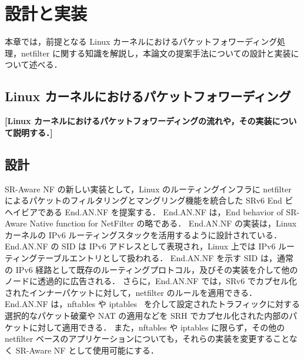 \chapter{設計と実装}
\label{chap:design_and_impl}
本章では，前提となる Linux カーネルにおけるパケットフォワーディング処理，netfilter に関する知識を解説し，本論文の提案手法についての設計と実装について述べる．
\section{Linux カーネルにおけるパケットフォワーディング}
\textbf{[Linux カーネルにおけるパケットフォワーディングの流れや，その実装について説明する．]}

\section{設計}
SR-Aware NF の新しい実装として，Linux のルーティングインフラに netfilter によるパケットのフィルタリングとマングリング機能を統合した SRv6 End ビヘイビアである End.AN.NF を提案する．
End.AN.NF は，End behavior of SR-Aware Native function for NetFilter の略である．
End.AN.NF の実装は，Linux カーネルの IPv6 ルーティングスタックを活用するように設計されている．
End.AN.NF の SID は IPv6 アドレスとして表現され，Linux 上では IPv6 ルーティングテーブルエントリとして扱われる．
End.AN.NF を示す SID は，通常の IPv6 経路として既存のルーティングプロトコル，及びその実装を介して他のノードに透過的に広告される．
さらに，End.AN.NF では，SRv6 でカプセル化されたインナーパケットに対して，netfilter のルールを適用できる．
End.AN.NF は，nftables\cite{nftables} や iptables~\cite{iptables} を介して設定されたトラフィックに対する選択的なパケット破棄や NAT の適用などを SRH でカプセル化された内部のパケットに対して適用できる．
また，nftables や iptables に限らず，その他の netfilter ベースのアプリケーションについても，それらの実装を変更することなく SR-Aware NF として使用可能にする．

